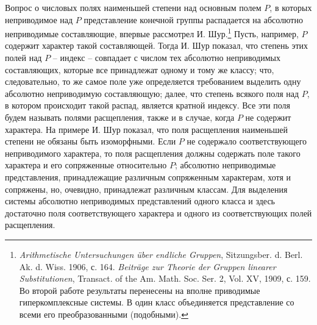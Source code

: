 \documentclass[11pt]{article}
\begin{document}
\setcounter{footnote}{0}

\noindent Вопрос о числовых полях наименьшей степени над основным полем $P$, в которых неприводимое над $P$ представление конечной группы распадается на абсолютно неприводимые составляющие, впервые рассмотрел И. Шур.\footnote{\emph{Arithmetische Untersuchungen über endliche Gruppen}, Sitzungsber. d. Berl. Ak. d. Wiss. 1906, с. 164. \emph{Beiträge zur Theorie der Gruppen linearer Substitutionen}, Transact. of the Am. Math. Soc. Ser. 2, Vol. XV, 1909, с. 159. Во второй работе результаты перенесены на вполне приводимые гиперкомплексные системы. В один класс объединяется представление со всеми его преобразованными (подобными).} Пусть, например, $P$ содержит характер такой составляющей. Тогда И. Шур показал, что степень этих полей над $P$ -- индекс -- совпадает с числом тех абсолютно неприводимых составляющих, которые все принадлежат одному и тому же классу; что, следовательно, то же самое поле уже определяется требованием выделить одну абсолютно неприводимую составляющую; далее, что степень всякого поля над $P$, в котором происходит такой распад, является кратной индексу. Все эти поля будем называть полями расщепления, также и в случае, когда $P$ не содержит характера. На примере И. Шур показал, что поля расщепления наименьшей степени не обязаны быть изоморфными. Если $P$ не содержало соответствующего неприводимого характера, то поля расщепления должны содержать поле такого характера и его сопряженные относительно $P$; абсолютно неприводимые представления, принадлежащие различным сопряженным характерам, хотя и сопряжены, но, очевидно, принадлежат различным классам. Для выделения системы абсолютно неприводимых представлений одного класса и здесь достаточно поля соответствующего характера и одного из соответствующих полей расщепления.
\end{document}
